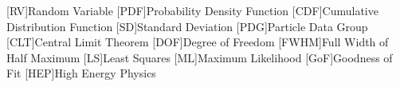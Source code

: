 \documentclass[
	10pt,
	draft
]{scrreprt}
\title{}
\author{}
\date{}
\begin{document}
\maketitle

\begin{acronym}[FWHM]
	[RV]{Random Variable}
	[PDF]{Probability Density Function}
	[CDF]{Cumulative Distribution Function}
	[SD]{Standard Deviation}
	[PDG]{Particle Data Group}
	[CLT]{Central Limit Theorem}
	[DOF]{Degree of Freedom}
	[FWHM]{Full Width of Half Maximum}
	[LS]{Least Squares}
	[ML]{Maximum Likelihood}
	[GoF]{Goodness of Fit}
	[HEP]{High Energy Physics}
\end{acronym}

\tableofcontents













	\cleardoublepage
	\nocite{*}
	\printbibliography

	\cleardoublepage
	\printindex
\end{document}
